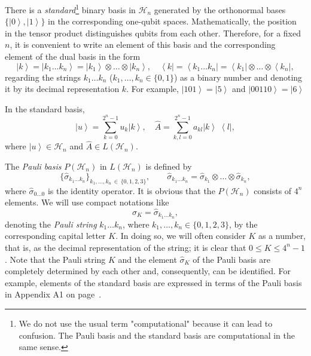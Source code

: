 \documentclass[12pt,a4paper,twoside]{article}      %
\newcommand{\ket}[1] {{\ensuremath{\left|#1\right\rangle}}}
\newcommand{\bra}[1] {{\ensuremath{\left\langle#1\right|}}}
\newcommand{\ketbra}[2]{{\ensuremath {\left|#1\right\rangle\!\;\!\!\left\langle#2\right|}}}
\begin{document}
There is a \textit{standard}\footnote{We do not use the usual term "computational" because it can lead to confusion. The Pauli basis and the standard basis are computational in the same sense.} binary basis in $\mathcal{H}_n$ generated by the orthonormal bases $\{\ket{0},\ket{1}\}$ in the corresponding one-qubit spaces. Mathematically, the position in the tensor product distinguishes qubits from each other. Therefore, for a fixed $n$, it is convenient to write an element of this basis and the corresponding element of the dual basis in the form
\begin{equation}\label{}
\ket{k}= \ket{k_1\ldots{}k_n}= \ket{k_1}\otimes\ldots\otimes\ket{k_n},
\quad
\bra{k}= \bra{k_1\ldots{}k_n}= \bra{k_1}\otimes\ldots\otimes\bra{k_n},
\nonumber
\end{equation}
regarding the strings $k_1\ldots{}k_n$  ($k_1,\ldots{},k_n\in\{0,1\}$) as a binary number and denoting it by its decimal representation $k$. For example, $\ket{101}=\ket{5}$ and $\ket{00110}=\ket{6}$

In the standard basis,
\begin{equation}\label{}
\ket{u}= \sum\limits_{k=0}^{2^n-1}u_k\ket{k}, \quad
\hat{A}= \sum\limits_{k,l=0}^{2^n-1}a_{kl}\ketbra{k}{l},
\nonumber
\end{equation}
where $\ket{u}\in\mathcal{H}_n$ and $\hat{A}\in L(\mathcal{H}_n)$.

The \textit{Pauli basis} $P(\mathcal{H}_n)$ in $L(\mathcal{H}_n)$ is defined by
\begin{equation}\label{basis} \big\{\hat{\sigma}_{k_1\ldots{}k_n} \big\}_{k_1,\ldots,k_n\,\in\, \{0,1,2,3\}},
\qquad
\hat{\sigma}_{k_1\ldots{}k_n}= \hat{\sigma}_{k_1}\otimes\ldots\otimes\hat{\sigma}_{k_n},
\end{equation}
where $\hat{\sigma}_{0\ldots0}$ is the identity operator. It is obvious that the $P(\mathcal{H}_n)$ consists of $4^{n}$ elements. We will use compact notations like
\begin{equation}\label{}
\hat{\sigma}_K= \hat{\sigma}_{k_1\ldots{}k_n},
\nonumber
\end{equation}
denoting the \textit{Pauli string} $k_1\ldots{}k_n$, where $k_1,\ldots,k_n\in\{0,1,2,3\}$, by the corresponding capital letter $K$. In doing so, we will often consider $K$ as a number, that is, as the decimal representation of the string; it is clear that $0\leqslant{K}\leqslant4^n-1$. Note that the Pauli string $K$ and the element $\hat{\sigma}_K$ of the Pauli basis are completely determined by each other and, consequently, can be identified. For example, elements of the standard basis are expressed in terms of the Pauli basis in Appendix A1 on page~\pageref{A1}.
\end{document}
